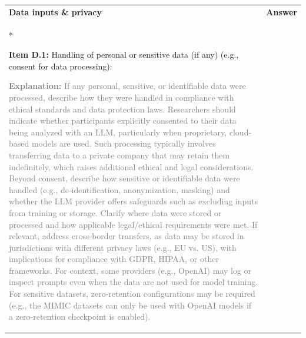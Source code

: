\documentclass[12pt]{article}
\begin{document}
\begin{longtable}{|p{}|p{}|}
\hline
\rowcolor{green!20}
\textbf{{Data inputs \& privacy}} & \textbf{Answer} \\*   %
\hline

\textbf{Item D.1:} Handling of personal or sensitive data (if any) (e.g., consent for data processing): 

\textcolor{gray}{{\footnotesize
\textbf{Explanation:} If any personal, sensitive, or identifiable data were processed, describe how they were handled in compliance with ethical standards and data protection laws. Researchers should indicate whether participants explicitly consented to their data being analyzed with an LLM, particularly when proprietary, cloud-based models are used. Such processing typically involves transferring data to a private company that may retain them indefinitely, which raises additional ethical and legal considerations. Beyond consent, describe how sensitive or identifiable data were handled (e.g., de-identification, anonymization, masking) and whether the LLM provider offers safeguards such as excluding inputs from training or storage. Clarify where data were stored or processed and how applicable legal/ethical requirements were met. If relevant, address cross-border transfers, as data may be stored in jurisdictions with different privacy laws (e.g., EU vs. US), with implications for compliance with GDPR, HIPAA, or other frameworks.
For context, some providers (e.g., OpenAI) may log or inspect prompts even when the data are not used for model training. For sensitive datasets, zero-retention configurations may be required (e.g., the MIMIC datasets can only be used with OpenAI models if a zero-retention checkpoint is enabled).
}}
&   \\
\hline
\end{longtable}
\end{document}
